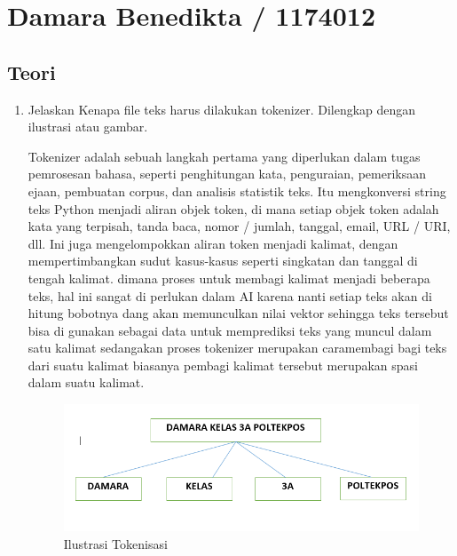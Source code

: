 \section{Damara Benedikta / 1174012}
\subsection{Teori}

\begin{enumerate}

\item Jelaskan Kenapa file teks harus dilakukan tokenizer. Dilengkap dengan ilustrasi atau gambar.\par
Tokenizer adalah  sebuah langkah pertama yang diperlukan dalam tugas pemrosesan bahasa, 
seperti penghitungan kata, penguraian, pemeriksaan ejaan, pembuatan corpus, dan analisis statistik teks. 
Itu mengkonversi string teks Python menjadi aliran objek token, di mana setiap objek token adalah kata yang terpisah,
tanda baca, nomor / jumlah, tanggal, email, URL / URI, dll. Ini juga mengelompokkan aliran token menjadi kalimat, 
dengan mempertimbangkan sudut kasus-kasus seperti singkatan dan tanggal di tengah kalimat. 
dimana proses untuk membagi kalimat menjadi beberapa teks, 
hal ini sangat di perlukan dalam AI karena nanti setiap teks akan di hitung bobotnya dang akan memunculkan nilai 
vektor sehingga teks tersebut bisa di gunakan sebagai data untuk memprediksi teks yang muncul dalam satu kalimat 
sedangakan proses tokenizer merupakan caramembagi bagi teks dari suatu kalimat biasanya pembagi kalimat tersebut merupakan spasi
dalam suatu kalimat.

\begin{figure}[ht]
\centering
\includegraphics[scale=0.4]{figures/1174012/chapter7/1,1.PNG}
\caption{Ilustrasi Tokenisasi}
\label{Contoh}
\end{figure}



\end{enumerate}

